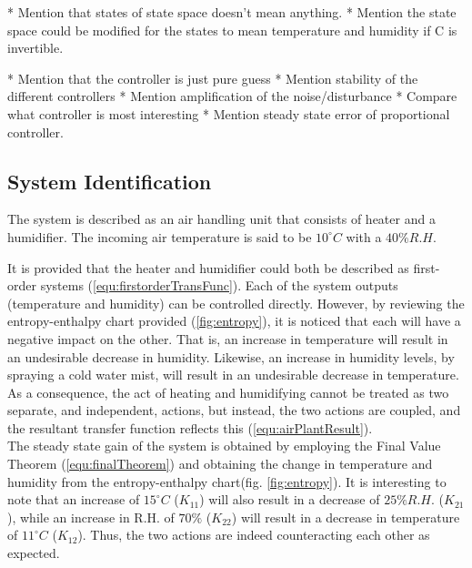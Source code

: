 \documentclass[a4paper, titlepage]{article}
\begin{document}
* Mention that states of state space doesn't mean anything.
* Mention the state space could be modified for the states to mean temperature and humidity if C is invertible.

* Mention that the controller is just pure guess
* Mention stability of the different controllers
* Mention amplification of the noise/disturbance
* Compare what controller is most interesting
* Mention steady state error of proportional controller.

\subsection{System Identification}



The system is described as an air handling unit that consists of heater and a humidifier.
The incoming air temperature is said to be $10^\circ C$ with a $40\% R.H.$ 

It is provided that the heater and humidifier could both be described as first-order systems (\ref{equ:firstorderTransFunc}).
Each of the system outputs (temperature and humidity) can be controlled directly.  
However, by reviewing the entropy-enthalpy chart provided (\ref{fig:entropy}), it is noticed that each will have a negative impact on the other.  
That is, an increase in temperature will result in an undesirable decrease in humidity.  
Likewise, an increase in humidity levels, by spraying a cold water mist, will result in an undesirable decrease in temperature.\\

As a consequence, the act of heating and humidifying cannot be treated as two separate, and independent, actions, but instead, the two actions are coupled, and the resultant transfer function reflects this (\ref{equ:airPlantResult}).\\

The steady state gain of the system is obtained by employing the Final Value Theorem (\ref{equ:finalTheorem}) and obtaining the change in temperature and humidity from the entropy-enthalpy chart(fig. \ref{fig:entropy}).  It is interesting to note that an increase of $15^\circ C$ ($K_{11}$) will also result in a decrease of $25\% R.H.$ ($K_{21}$), while an increase in R.H. of $70\%$ ($K_{22}$) will result in a decrease in temperature of $11^\circ C$ ($K_{12}$).  Thus, the two actions are indeed counteracting each other as expected.\\
\end{document}
